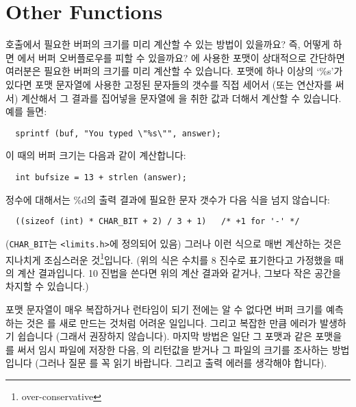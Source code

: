 \section{Other  Functions}	\label{sec:otherstdio}

\begin{faq}
	 호출에서 필요한 버퍼의 크기를 미리 계산할 수 있는
	방법이 있을까요? 즉, 어떻게 하면 에서 버퍼 오버플로우를
	피할 수 있을까요?
\A
%
% 
%
%
	에 사용한 포맷이 상대적으로 간단하면 여러분은 필요한
	버퍼의 크기를 미리 계산할 수 있습니다.  포맷에 하나 이상의 `\%s'가
	있다면 포맷 문자열에 사용한 고정된 문자들의 갯수를 직접 세어서
	(또는  연산자를 써서) 계산해서 그 결과를 집어넣을
	문자열에 을 취한 값과 더해서 계산할 수 있습니다.
	예를 들면:
\begin{verbatim}
  sprintf (buf, "You typed \"%s\"", answer);
\end{verbatim}
	\noindent 이 때의 버퍼 크기는 다음과 같이 계산합니다:
\begin{verbatim}
  int bufsize = 13 + strlen (answer);
\end{verbatim}
	\noindent 정수에 대해서는 \%d의 출력 결과에 필요한 문자 갯수가 
	다음 식을 넘지 않습니다:
\begin{verbatim}
  ((sizeof (int) * CHAR_BIT + 2) / 3 + 1)   /* +1 for '-' */
\end{verbatim}
	\noindent (\verb+CHAR_BIT+는 \verb+<limits.h>+에 정의되어
	있음) 그러나 이런 식으로 매번 계산하는 것은 지나치게 조심스러운
	것\footnote{over-conservative}입니다.  (위의 식은 수치를 8 진수로
	표기한다고 가정했을 때의 계산 결과입니다.  10 진법을 쓴다면 위의 계산
	결과와 같거나, 그보다 작은 공간을 차지할 수 있습니다.)

	포맷 문자열이 매우 복잡하거나 런타임이 되기 전에는 알 수 없다면
	버퍼 크기를 예측하는 것은 를 새로 만드는 것처럼 어려운
	일입니다.  그리고 복잡한 만큼 에러가 발생하기 쉽습니다 (그래서 권장하지
	않습니다).  마지막 방법은 일단 그 포맷과 같은 포맷을 를
	써서 임시 파일에 저장한 다음, 의 리턴값을 받거나
	그 파일의 크기를 조사하는 방법입니다 (그러나 질문 를
	꼭 읽기 바랍니다.  그리고 출력 에러를 생각해야 합니다).


\end{faq}
